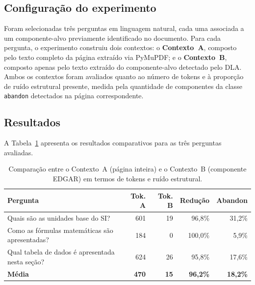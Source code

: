 \subsection{Configuração do experimento}
\label{subsec:ruido_config}

Foram selecionadas três perguntas em linguagem natural, cada uma
associada a um componente-alvo previamente identificado no documento.
Para cada pergunta, o experimento construiu dois contextos: o
\textbf{Contexto~A}, composto pelo texto completo da página extraído
via PyMuPDF; e o \textbf{Contexto~B}, composto apenas pelo texto
extraído do componente-alvo detectado pelo DLA. Ambos os contextos
foram avaliados quanto ao número de tokens e à proporção de ruído
estrutural presente, medida pela quantidade de componentes da classe
\texttt{abandon} detectados na página correspondente.

\subsection{Resultados}
\label{subsec:ruido_resultados}

A Tabela~\ref{tab:ruido_contextual} apresenta os resultados comparativos
para as três perguntas avaliadas.

\begin{table}[H]
\centering
\caption{Comparação entre o Contexto~A (página inteira) e o Contexto~B
         (componente EDGAR) em termos de tokens e ruído estrutural.}
\label{tab:ruido_contextual}
\begin{tabular}{p{5.2cm}rrrr}
\toprule
\textbf{Pergunta} &
\textbf{Tok. A} &
\textbf{Tok. B} &
\textbf{Redução} &
\textbf{Abandon} \\
\midrule
Quais são as unidades base do SI?
  & 601 & 19 & 96,8\% & 31,2\% \\
Como as fórmulas matemáticas são apresentadas?
  & 184 &  0 & 100,0\% &  5,9\% \\
Qual tabela de dados é apresentada nesta seção?
  & 624 & 26 & 95,8\% & 17,6\% \\
\midrule
\textbf{Média}
  & \textbf{470} & \textbf{15} & \textbf{96,2\%} & \textbf{18,2\%} \\
\bottomrule
\end{tabular}
\end{table}

